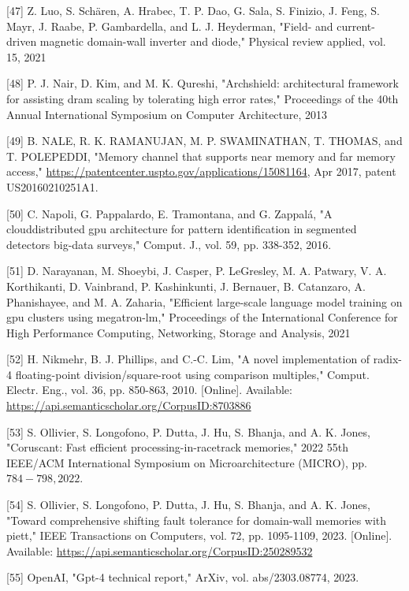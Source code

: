 \documentclass[10pt]{article}
\begin{document}
[47] Z. Luo, S. Schären, A. Hrabec, T. P. Dao, G. Sala, S. Finizio, J. Feng, S. Mayr, J. Raabe, P. Gambardella, and L. J. Heyderman, "Field- and current-driven magnetic domain-wall inverter and diode," Physical review applied, vol. 15, 2021

[48] P. J. Nair, D. Kim, and M. K. Qureshi, "Archshield: architectural framework for assisting dram scaling by tolerating high error rates," Proceedings of the 40th Annual International Symposium on Computer Architecture, 2013

[49] B. NALE, R. K. RAMANUJAN, M. P. SWAMINATHAN, T. THOMAS, and T. POLEPEDDI, "Memory channel that supports near memory and far memory access," \href{https://patentcenter.uspto.gov/applications/15081164}{https://patentcenter.uspto.gov/applications/15081164}, Apr 2017, patent US20160210251A1.

[50] C. Napoli, G. Pappalardo, E. Tramontana, and G. Zappalá, "A clouddistributed gpu architecture for pattern identification in segmented detectors big-data surveys," Comput. J., vol. 59, pp. 338-352, 2016.

[51] D. Narayanan, M. Shoeybi, J. Casper, P. LeGresley, M. A. Patwary, V. A. Korthikanti, D. Vainbrand, P. Kashinkunti, J. Bernauer, B. Catanzaro, A. Phanishayee, and M. A. Zaharia, "Efficient large-scale language model training on gpu clusters using megatron-lm," Proceedings of the International Conference for High Performance Computing, Networking, Storage and Analysis, 2021

[52] H. Nikmehr, B. J. Phillips, and C.-C. Lim, "A novel implementation of radix-4 floating-point division/square-root using comparison multiples," Comput. Electr. Eng., vol. 36, pp. 850-863, 2010. [Online]. Available: \href{https://api.semanticscholar.org/CorpusID:8703886}{https://api.semanticscholar.org/CorpusID:8703886}

[53] S. Ollivier, S. Longofono, P. Dutta, J. Hu, S. Bhanja, and A. K. Jones, "Coruscant: Fast efficient processing-in-racetrack memories," 2022 55th IEEE/ACM International Symposium on Microarchitecture (MICRO), pp. $784-798,2022$.

[54] S. Ollivier, S. Longofono, P. Dutta, J. Hu, S. Bhanja, and A. K. Jones, "Toward comprehensive shifting fault tolerance for domain-wall memories with piett," IEEE Transactions on Computers, vol. 72, pp. 1095-1109, 2023. [Online]. Available: \href{https://api.semanticscholar.org/CorpusID:250289532}{https://api.semanticscholar.org/CorpusID:250289532}

[55] OpenAI, "Gpt-4 technical report," ArXiv, vol. abs/2303.08774, 2023.
\end{document}
